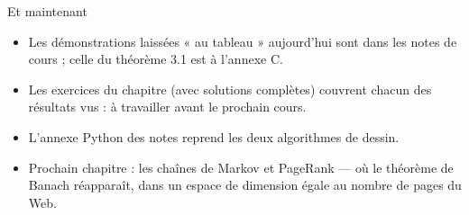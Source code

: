 \begin{frame}{Et maintenant}
  \begin{itemize}
    \item Les démonstrations laissées « au tableau » aujourd'hui sont
      dans les notes de cours ; celle du théorème 3.1 est à l'annexe C.
    \item Les exercices du chapitre (avec solutions complètes) couvrent
      chacun des résultats vus : à travailler avant le prochain cours.
    \item L'annexe Python des notes reprend les deux algorithmes de
      dessin.
    \item Prochain chapitre : les chaînes de Markov et PageRank --- où le
      théorème de Banach réapparaît, dans un espace de dimension égale au
      nombre de pages du Web.
  \end{itemize}
\end{frame}
